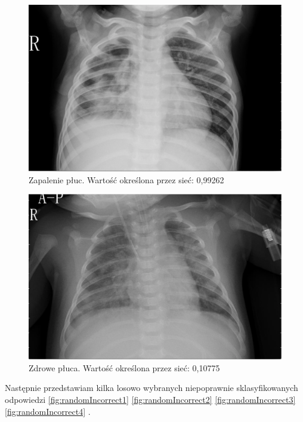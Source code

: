 \documentclass[12pt,a4paper,twoside,titlepage,openright]{book}
\begin{document}
\begin{itemize}
\begin{itemize}
\begin{figure}[ht]
	\centering
			\includegraphics[resolution=100, scale=0.3]{randomCorrect3.png}
		\caption{Zapalenie płuc. Wartość określona przez sieć: 0,99262}
				\label{fig:randomCorrect3}
\end{figure}

\begin{figure}[ht]
	\centering
			\includegraphics[resolution=100, scale=0.3]{randomCorrect4.png}
		\caption{Zdrowe płuca. Wartość określona przez sieć: 0,10775}
				\label{fig:randomCorrect4}
\end{figure}

Następnie przedstawiam kilka losowo wybranych niepoprawnie sklasyfikowanych odpowiedzi \ref{fig:randomIncorrect1} \ref{fig:randomIncorrect2} \ref{fig:randomIncorrect3} \ref{fig:randomIncorrect4} .


\end{itemize}
\end{itemize}
\end{document}
